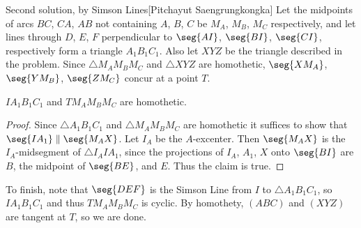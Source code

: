 \begin{customenv}{Second solution, by Simson Lines}[Pitchayut Saengrungkongka]
    Let the midpoints of arcs $BC$, $CA$, $AB$ not containing $A$, $B$, $C$ be $M_A$, $M_B$, $M_C$ respectively, and let lines through $D$, $E$, $F$ perpendicular to $\seg{AI}$, $\seg{BI}$, $\seg{CI}$, respectively form a triangle $A_1B_1C_1$. Also let $XYZ$ be the triangle described in the problem. Since $\triangle M_AM_BM_C$ and $\triangle XYZ$ are homothetic, $\seg{XM_A}$, $\seg{YM_B}$, $\seg{ZM_C}$ concur at a point $T$.
    \begin{iclaim*}
        $IA_1B_1C_1$ and $TM_AM_BM_C$ are homothetic.
    \end{iclaim*}
    \begin{proof}
        Since $\triangle A_1B_1C_1$ and $\triangle M_AM_BM_C$ are homothetic it suffices to show that $\seg{IA_1}\parallel\seg{M_AX}$. Let $I_A$ be the $A$-excenter. Then $\seg{M_AX}$ is the $I_A$-midsegment of $\triangle I_AIA_1$, since the projections of $I_A$, $A_1$, $X$ onto $\seg{BI}$ are $B$, the midpoint of $\seg{BE}$, and $E$. Thus the claim is true.
    \end{proof}

    To finish, note that $\seg{DEF}$ is the Simson Line from $I$ to $\triangle A_1B_1C_1$, so $IA_1B_1C_1$ and thus $TM_AM_BM_C$ is cyclic. By homothety, $(ABC)$ and $(XYZ)$ are tangent at $T$, so we are done. 
\end{customenv}
